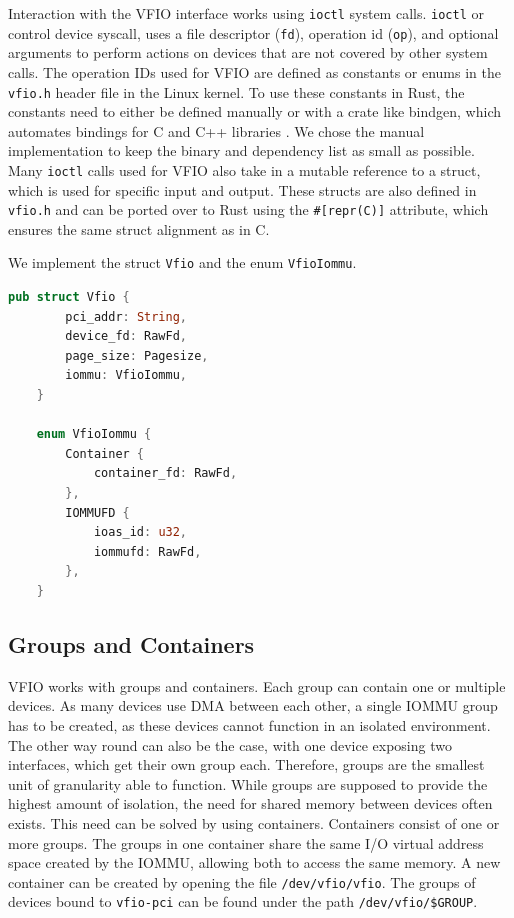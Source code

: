 Interaction with the VFIO interface works using \texttt{ioctl} system calls.
\texttt{ioctl} or control device syscall, uses a file descriptor (\texttt{fd}), operation id (\texttt{op}), and optional arguments to perform actions on devices that are not covered by other system calls.
The operation IDs used for VFIO are defined as constants or enums in the \texttt{vfio.h} header file in the Linux kernel. To use these constants in Rust, the constants need to either be defined manually or with a crate like bindgen, which automates bindings for C and C++ libraries \cite{cratebindgen}. We chose the manual implementation to keep the binary and dependency list as small as possible.
Many \texttt{ioctl} calls used for VFIO also take in a mutable reference to a struct, which is used for specific input and output. These structs are also defined in \texttt{vfio.h} and can be ported over to Rust using the \texttt{\#[repr(C)]} attribute, which ensures the same struct alignment as in C.

We implement the struct \texttt{Vfio} and the enum \texttt{VfioIommu}.

\begin{lstlisting}[language=Rust,caption={Structs used to model VFIO}, label=lst:vfiostructs]
    pub struct Vfio {
        pci_addr: String,
        device_fd: RawFd,
        page_size: Pagesize,
        iommu: VfioIommu,
    }

    enum VfioIommu {
        Container {
            container_fd: RawFd,
        },
        IOMMUFD {
            ioas_id: u32,
            iommufd: RawFd,
        },
    }
\end{lstlisting}

\subsection{Groups and Containers}
VFIO works with groups and containers. Each group can contain one or multiple devices. As many devices use DMA between each other, a single IOMMU group has to be created, as these devices cannot function in an isolated environment. The other way round can also be the case, with one device exposing two interfaces, which get their own group each. Therefore, groups are the smallest unit of granularity able to function. While groups are supposed to provide the highest amount of isolation, the need for shared memory between devices often exists. This need can be solved by using containers. Containers consist of one or more groups. The groups in one container share the same I/O virtual address space created by the IOMMU, allowing both to access the same memory.
A new container can be created by opening the file \texttt{/dev/vfio/vfio}. The groups of devices bound to \texttt{vfio-pci} can be found under the path \texttt{/dev/vfio/\$GROUP}.


